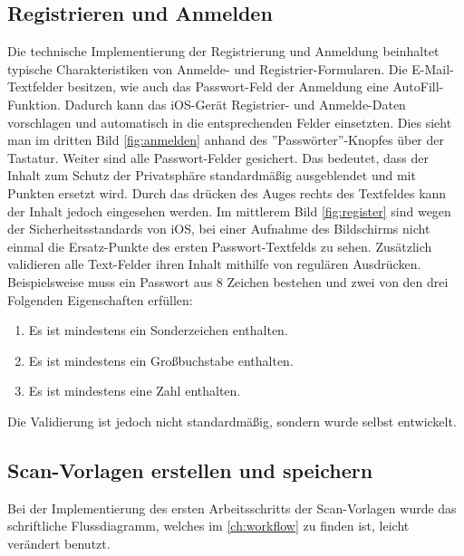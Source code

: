 \documentclass[notables, nomenclature, oneside, 150]{HSMW-Thesis}
\begin{document}
		\subsection{Registrieren und Anmelden}
			Die technische Implementierung der Registrierung und Anmeldung beinhaltet typische Charakteristiken von Anmelde- und Registrier-Formularen. Die E-Mail-Textfelder besitzen, wie auch das Passwort-Feld der Anmeldung eine AutoFill-Funktion. Dadurch kann das iOS-Gerät Registrier- und Anmelde-Daten vorschlagen und automatisch in die entsprechenden Felder einsetzten. Dies sieht man im dritten Bild \ref{fig:anmelden} anhand des ''Passwörter''-Knopfes über der Tastatur.  Weiter sind alle Passwort-Felder gesichert. Das bedeutet, dass der Inhalt zum Schutz der Privatsphäre standardmäßig ausgeblendet und mit Punkten ersetzt wird. Durch das drücken des Auges rechts des Textfeldes kann der Inhalt jedoch eingesehen werden. Im mittlerem Bild \ref{fig:register} sind wegen der Sicherheitsstandards von iOS, bei einer Aufnahme des Bildschirms nicht einmal die Ersatz-Punkte des ersten Passwort-Textfelds zu sehen. Zusätzlich validieren alle Text-Felder ihren Inhalt mithilfe von regulären Ausdrücken. Beispielsweise muss ein Passwort aus 8 Zeichen bestehen und zwei von den drei Folgenden Eigenschaften erfüllen:
			\begin{enumerate}
				\item Es ist mindestens ein Sonderzeichen enthalten.
				\item Es ist mindestens ein Großbuchstabe enthalten.
				\item Es ist mindestens eine Zahl enthalten.
			\end{enumerate}
			Die Validierung ist jedoch nicht standardmäßig, sondern wurde selbst entwickelt.
			
		\subsection{Scan-Vorlagen erstellen und speichern}
			Bei der Implementierung des ersten Arbeitsschritts der Scan-Vorlagen wurde das schriftliche Flussdiagramm, welches im \autoref{ch:workflow} zu finden ist, leicht verändert benutzt.
			
\end{document}
